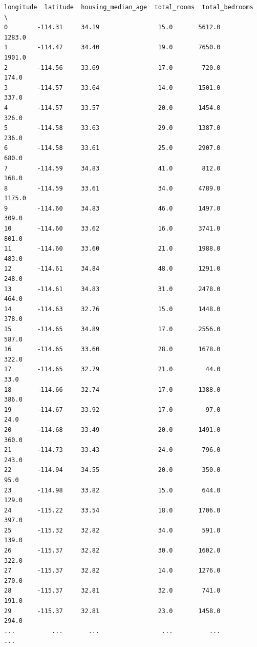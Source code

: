 \begin{lstlisting}[style=outputcell]
       longitude  latitude  housing_median_age  total_rooms  total_bedrooms  \
0        -114.31     34.19                15.0       5612.0          1283.0   
1        -114.47     34.40                19.0       7650.0          1901.0   
2        -114.56     33.69                17.0        720.0           174.0   
3        -114.57     33.64                14.0       1501.0           337.0   
4        -114.57     33.57                20.0       1454.0           326.0   
5        -114.58     33.63                29.0       1387.0           236.0   
6        -114.58     33.61                25.0       2907.0           680.0   
7        -114.59     34.83                41.0        812.0           168.0   
8        -114.59     33.61                34.0       4789.0          1175.0   
9        -114.60     34.83                46.0       1497.0           309.0   
10       -114.60     33.62                16.0       3741.0           801.0   
11       -114.60     33.60                21.0       1988.0           483.0   
12       -114.61     34.84                48.0       1291.0           248.0   
13       -114.61     34.83                31.0       2478.0           464.0   
14       -114.63     32.76                15.0       1448.0           378.0   
15       -114.65     34.89                17.0       2556.0           587.0   
16       -114.65     33.60                28.0       1678.0           322.0   
17       -114.65     32.79                21.0         44.0            33.0   
18       -114.66     32.74                17.0       1388.0           386.0   
19       -114.67     33.92                17.0         97.0            24.0   
20       -114.68     33.49                20.0       1491.0           360.0   
21       -114.73     33.43                24.0        796.0           243.0   
22       -114.94     34.55                20.0        350.0            95.0   
23       -114.98     33.82                15.0        644.0           129.0   
24       -115.22     33.54                18.0       1706.0           397.0   
25       -115.32     32.82                34.0        591.0           139.0   
26       -115.37     32.82                30.0       1602.0           322.0   
27       -115.37     32.82                14.0       1276.0           270.0   
28       -115.37     32.81                32.0        741.0           191.0   
29       -115.37     32.81                23.0       1458.0           294.0   
...          ...       ...                 ...          ...             ...   

\end{lstlisting}
